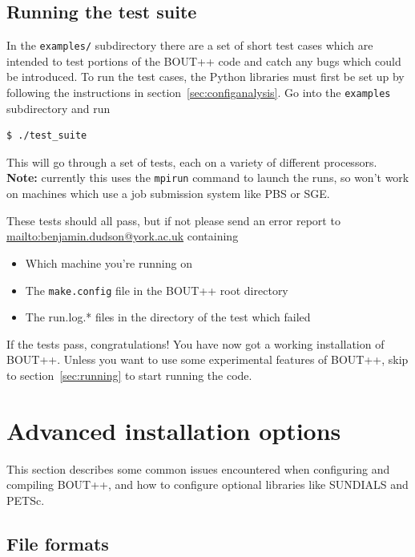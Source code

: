\documentclass[12pt]{article}
\begin{document}
\subsection{Running the test suite}
\label{sec:runtestsuite}

In the \texttt{examples/} subdirectory there are a set of short test cases 
which are intended to test portions of the BOUT++ code and catch any bugs
which could be introduced. To run the test cases, the Python libraries
must first be set up by following the instructions in section~\ref{sec:configanalysis}. 
Go into the \texttt{examples} subdirectory and run
\begin{verbatim}
$ ./test_suite
\end{verbatim}

This will go through a set of tests,
each on a variety of different processors. {\bf Note:} currently this uses
the \texttt{mpirun} command to launch the runs, so won't work on machines which
use a job submission system like PBS or SGE.

These tests should all pass, but if not please send an error report to
\url{mailto:benjamin.dudson@york.ac.uk} containing
\begin{itemize}
\item Which machine you're running on
\item The \texttt{make.config} file in the BOUT++ root directory
\item The run.log.* files in the directory of the test which failed
\end{itemize}

If the tests pass, congratulations! You have now got a working installation of BOUT++. 
Unless you want to use some experimental features of BOUT++, skip to section~\ref{sec:running}
to start running the code.

\section{Advanced installation options}
\label{sec:advancedinstall}

This section describes some common issues encountered when configuring
and compiling BOUT++, and how to configure optional libraries like
SUNDIALS and PETSc.

\subsection{File formats}
\end{document}
